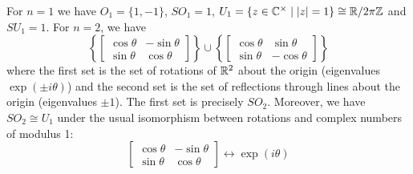 \begin{exam}
  For $n=1$ we have $O_1=\{1,-1\}$, $SO_1=1$, $U_1=\{z \in \mathbb{C}^\times \mid \left\lvert z \right\rvert=1\} \cong \mathbb{R}/2\pi\mathbb{Z}$ and $SU_1=1$.
  For $n=2$, we have
  \[\left\{ 
      \begin{bmatrix}
	\cos\theta & -\sin\theta \\ \sin\theta & \cos\theta
      \end{bmatrix}
    \right\}
    \cup
    \left\{ 
      \begin{bmatrix}
	\cos\theta & \sin\theta \\ \sin\theta & -\cos\theta
      \end{bmatrix}
  \right\}\]
  where the first set is the set of rotations of $\mathbb{R}^2$ about the origin (eigenvalues $\exp(\pm i\theta)$) and the second set is the set of reflections through lines about the origin (eigenvalues $\pm 1$).
  The first set is precisely $SO_2$.
  Moreover, we have $SO_2 \cong U_1$ under the usual isomorphism between rotations and complex numbers of modulus 1:
  \[
    \begin{bmatrix}
      \cos\theta & -\sin\theta \\ \sin\theta & \cos\theta
    \end{bmatrix}
    \longleftrightarrow
    \exp(i\theta)
  \]
\end{exam}

